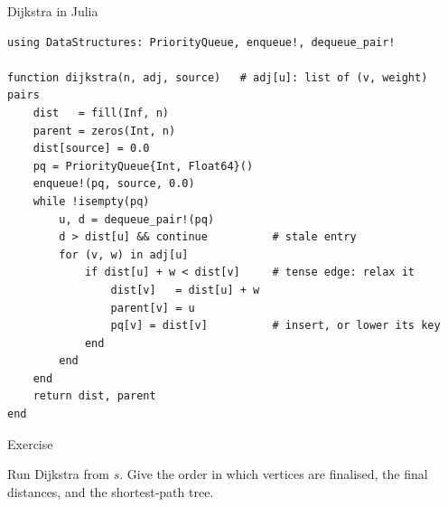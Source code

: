\documentclass[10pt,aspectratio=169]{beamer}
\begin{document}
\begin{frame}[fragile]{Dijkstra in Julia}
\begin{lstlisting}[basicstyle=\ttfamily\scriptsize]
using DataStructures: PriorityQueue, enqueue!, dequeue_pair!

function dijkstra(n, adj, source)   # adj[u]: list of (v, weight) pairs
    dist   = fill(Inf, n)
    parent = zeros(Int, n)
    dist[source] = 0.0
    pq = PriorityQueue{Int, Float64}()
    enqueue!(pq, source, 0.0)
    while !isempty(pq)
        u, d = dequeue_pair!(pq)
        d > dist[u] && continue          # stale entry
        for (v, w) in adj[u]
            if dist[u] + w < dist[v]     # tense edge: relax it
                dist[v]   = dist[u] + w
                parent[v] = u
                pq[v] = dist[v]          # insert, or lower its key
            end
        end
    end
    return dist, parent
end
\end{lstlisting}
\end{frame}

\begin{frame}{Exercise}
  \begin{center}
    Run Dijkstra from $s$. Give the order in which vertices are finalised,
    the final distances, and the shortest-path tree.
  \end{center}

  \bigskip
  \begin{center}
  \end{center}
\end{frame}
\end{document}
